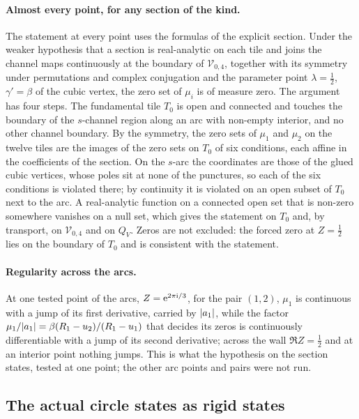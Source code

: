 \paragraph{Almost every point, for any section of the kind.}
The statement at every point uses the formulas of the explicit section.
Under the weaker hypothesis that a section is real-analytic on each tile and joins the channel maps continuously at the boundary of $\mathcal V_{0,4}$, together with its symmetry under permutations and complex conjugation and the parameter point $\lambda = \tfrac{1}{2}$, $\gamma' = \beta$ of the cubic vertex, the zero set of $\mu_i$ is of measure zero.
The argument has four steps.
The fundamental tile $T_0$ is open and connected and touches the boundary of the $s$-channel region along an arc with non-empty interior, and no other channel boundary.
By the symmetry, the zero sets of $\mu_1$ and $\mu_2$ on the twelve tiles are the images of the zero sets on $T_0$ of six conditions, each affine in the coefficients of the section.
On the $s$-arc the coordinates are those of the glued cubic vertices, whose poles sit at none of the punctures, so each of the six conditions is violated there; by continuity it is violated on an open subset of $T_0$ next to the arc.
A real-analytic function on a connected open set that is non-zero somewhere vanishes on a null set, which gives the statement on $T_0$ and, by transport, on $\mathcal V_{0,4}$ and on $Q_V$.
Zeros are not excluded: the forced zero at $Z = \tfrac{1}{2}$ lies on the boundary of $T_0$ and is consistent with the statement.

\paragraph{Regularity across the arcs.}
At one tested point of the arcs, $Z = \mathrm{e}^{2 \pi \mathrm{i} / 3}$, for the pair $(1, 2)$, $\mu_1$ is continuous with a jump of its first derivative, carried by ${|a_1|}$, while the factor $\mu_1 / {|a_1|} = \beta (R_1 - u_2) / (R_1 - u_1)$ that decides its zeros is continuously differentiable with a jump of its second derivative; across the wall $\Re Z = \tfrac{1}{2}$ and at an interior point nothing jumps.
This is what the hypothesis on the section states, tested at one point; the other arc points and pairs were not run.

\subsection{The actual circle states as rigid states}
\label{sec:wscircle:rigid}

